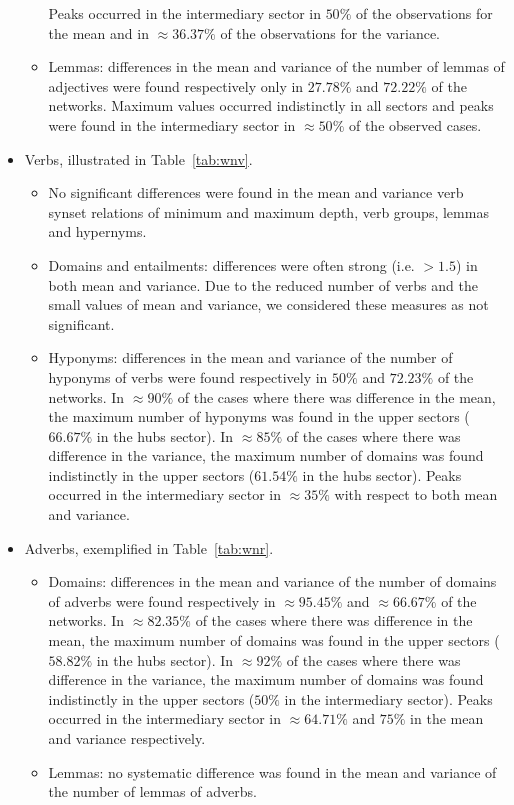\documentclass[review]{elsarticle}
\begin{document}
\begin{itemize}
\begin{itemize}
Peaks occurred in the intermediary sector in $50\%$ of the observations for the mean
and in $\approx 36.37\%$ of the observations for the variance.
\item Lemmas:
differences in the mean and variance of the number of lemmas of adjectives were found respectively only in $27.78\%$ and $72.22\%$ of the networks.
Maximum values occurred indistinctly in all sectors and peaks were found in the intermediary sector in $\approx 50\%$ of the observed cases.

\FloatBarrier
\end{itemize}
\item Verbs, illustrated in Table~\ref{tab:wnv}.
\begin{itemize}
\item No significant differences were found in the mean and variance verb synset relations of minimum and maximum depth, verb groups, lemmas and hypernyms.
\item Domains and entailments:
differences were often strong (i.e. $>1.5$) in both mean and variance.
Due to the reduced number of verbs and the small values of mean and variance,
we considered these measures as not significant.
\item Hyponyms:
differences in the mean and variance of the number of hyponyms of verbs were found respectively in $50\%$ and $72.23\%$ of the networks.
In $\approx 90\%$ of the cases where there was difference in the mean, 
the maximum number of hyponyms was found in the upper sectors ($66.67\%$ in the hubs sector).
In $\approx 85\%$ of the cases where there was difference in the variance, 
the maximum number of domains was found indistinctly in the upper sectors ($61.54\%$ in the hubs sector).
Peaks occurred in the intermediary sector in $\approx 35\%$ with respect to both mean and variance.

\FloatBarrier
\end{itemize}
\item Adverbs, exemplified in Table~\ref{tab:wnr}.
\begin{itemize}
\item Domains:
differences in the mean and variance of the number of domains of adverbs were found respectively in $\approx 95.45\%$ and $\approx 66.67\%$ of the networks.
In $\approx 82.35\%$ of the cases where there was difference in the mean, 
the maximum number of domains was found in the upper sectors ($58.82\%$ in the hubs sector).
In $\approx 92\%$ of the cases where there was difference in the variance, 
the maximum number of domains was found indistinctly in the upper sectors ($50\%$ in the intermediary sector).
Peaks occurred in the intermediary sector in $\approx 64.71\%$ and $75\%$ in the mean and variance respectively.
\item Lemmas:
no systematic difference was found in the mean and variance of the number of lemmas of adverbs.

\FloatBarrier
\end{itemize}
\end{itemize}
\end{document}

